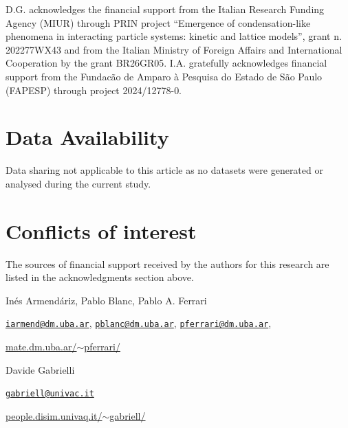 \documentclass[12pt]{article}
\numberwithin{equation}{section}
\begin{document}
D.G. acknowledges the financial support from the Italian Research Funding Agency (MIUR) through
PRIN project ``Emergence of condensation-like phenomena in interacting particle systems: kinetic and lattice models'', grant n. 202277WX43 and  from the Italian Ministry of Foreign Affairs and International Cooperation by the grant BR26GR05. I.A. gratefully acknowledges financial support from the Fundac\~ao de Amparo \`a Pesquisa do Estado de S\~ao Paulo (FAPESP) through project 2024/12778-0.

\section*{Data Availability} Data sharing not applicable to this article as no datasets were generated or analysed during the current study.

\section*{Conﬂicts of interest}
 The sources of ﬁnancial support received by the authors for this research are listed in
the acknowledgments section above.





\vspace{2cm}
\parskip 0pt
\parindent 0pt

\noindent Inés Armendáriz, Pablo Blanc, Pablo A. Ferrari


\noindent

\href{mailto:iarmend@dm.uba.ar}{\tt iarmend@dm.uba.ar}, 
\href{mailto:pblanc@dm.uba.ar}{\tt pblanc@dm.uba.ar}, 
\href{mailto:pferrari@dm.uba.ar}{\tt pferrari@dm.uba.ar}, 

\href{https://mate.dm.uba.ar/~pferrari/}{mate.dm.uba.ar/$\sim$pferrari/}

\bigskip
\noindent Davide Gabrielli


\noindent \href{mailto: gabriell@univac.it}{\tt gabriell@univac.it}

\href{https://people.disim.univaq.it/~gabriell/}{people.disim.univaq.it/$\sim$gabriell/}
\end{document}
